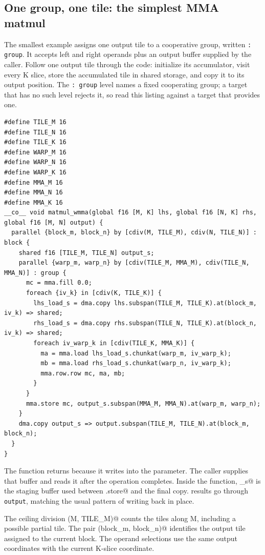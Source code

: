 \subsection*{One group, one tile: the simplest MMA matmul}

The smallest example assigns one output tile to a cooperative group, written \texttt{: group}. It accepts left and right operands plus an output buffer supplied by the caller. Follow one output tile through the code: initialize its accumulator, visit every K slice, store the accumulated tile in shared storage, and copy it to its output position. The \texttt{: group} level names a fixed cooperating group; a target that has no such level rejects it, so read this listing against a target that provides one.

\begin{lstlisting}[language=croqtile,caption={One group, one tile: the simplest MMA matmul}]
#define TILE_M 16
#define TILE_N 16
#define TILE_K 16
#define WARP_M 16
#define WARP_N 16
#define WARP_K 16
#define MMA_M 16
#define MMA_N 16
#define MMA_K 16
__co__ void matmul_wmma(global f16 [M, K] lhs, global f16 [N, K] rhs, global f16 [M, N] output) {
  parallel {block_m, block_n} by [cdiv(M, TILE_M), cdiv(N, TILE_N)] : block {
    shared f16 [TILE_M, TILE_N] output_s;
    parallel {warp_m, warp_n} by [cdiv(TILE_M, MMA_M), cdiv(TILE_N, MMA_N)] : group {
      mc = mma.fill 0.0;
      foreach {iv_k} in [cdiv(K, TILE_K)] {
        lhs_load_s = dma.copy lhs.subspan(TILE_M, TILE_K).at(block_m, iv_k) => shared;
        rhs_load_s = dma.copy rhs.subspan(TILE_N, TILE_K).at(block_n, iv_k) => shared;
        foreach iv_warp_k in [cdiv(TILE_K, MMA_K)] {
          ma = mma.load lhs_load_s.chunkat(warp_m, iv_warp_k);
          mb = mma.load rhs_load_s.chunkat(warp_n, iv_warp_k);
          mma.row.row mc, ma, mb;
        }
      }
      mma.store mc, output_s.subspan(MMA_M, MMA_N).at(warp_m, warp_n);
    }
    dma.copy output_s => output.subspan(TILE_M, TILE_N).at(block_m, block_n);
  }
}
\end{lstlisting}

The function returns \co@void@ because it writes into the \co@output@ parameter. The caller supplies that buffer and reads it after the operation completes. Inside the function, \co@output_s@ is the staging buffer used between \co@mma.store@ and the final copy. results go through \texttt{output}, matching the usual pattern of writing back in place.

The ceiling division \co@cdiv(M, TILE_M)@ counts the tiles along M, including a possible partial tile. The pair \co@(block_m, block_n)@ identifies the output tile assigned to the current block. The operand selections use the same output coordinates with the current K-slice coordinate.

